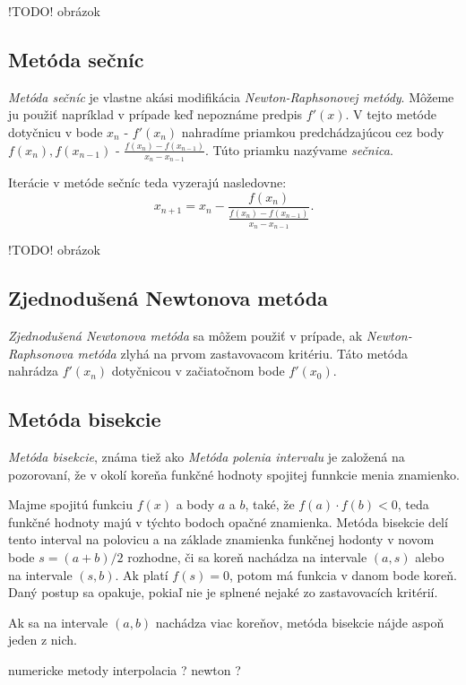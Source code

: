 !TODO! obrázok

\subsection{Metóda sečníc}

\textit{Metóda sečníc} je vlastne akási modifikácia \textit{Newton-Raphsonovej metódy}. Môžeme ju použiť napríklad v prípade 
keď nepoznáme predpis $f'(x)$. V tejto metóde dotyčnicu v bode $x_n$ - $f'(x_n)$ nahradíme priamkou 
predchádzajúcou cez body $f(x_n), f(x_{n-1})$ - $\frac{f(x_n) - f(x_{n-1})}{x_n - x_{n-1}}$. Túto priamku 
nazývame \textit{sečnica}.

Iterácie v metóde sečníc teda vyzerajú nasledovne:
$$ x_{n+1} = x_n - \frac{f(x_n)}{\frac{f(x_n) - f(x_{n-1})}{x_n - x_{n-1}}}.$$

!TODO! obrázok

\subsection{Zjednodušená Newtonova metóda}

\textit{Zjednodušená Newtonova metóda} sa môžem použiť v prípade, ak \textit{Newton-Raphsonova metóda} zlyhá na prvom 
zastavovacom kritériu. Táto metóda nahrádza $f'(x_n)$ dotyčnicou v začiatočnom bode $f'(x_0)$.  

\subsection{Metóda bisekcie}

\textit{Metóda bisekcie}, známa tiež ako \textit{Metóda polenia intervalu} je založená na pozorovaní, že v okolí koreňa 
funkčné hodnoty spojitej funnkcie menia znamienko. 

Majme spojitú funkciu $f(x)$ a body $a$ a $b$, také, že $f(a) \cdot f(b) < 0$, teda funkčné hodnoty majú v týchto bodoch 
opačné znamienka. Metóda bisekcie delí tento interval na polovicu a na základe znamienka funkčnej hodonty v novom bode $s = (a+b)/2$
rozhodne, či sa koreň nachádza na intervale $(a, s)$ alebo na intervale $(s, b)$. Ak platí $f(s) = 0$, potom má funkcia v danom bode 
koreň. Daný postup sa opakuje, pokiaľ nie je splnené nejaké zo zastavovacích kritérií.

Ak sa na intervale $(a, b)$ nachádza viac koreňov, metóda bisekcie nájde aspoň jeden z nich.


numericke metody
interpolacia ?
newton ?

\newpage
